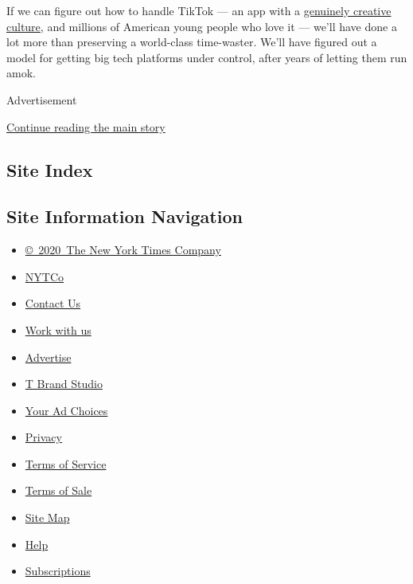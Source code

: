If we can figure out how to handle TikTok --- an app with a
\href{https://www.nytimes3xbfgragh.onion/2020/07/10/style/tiktok-ban-us-users-influencers-taylor-lorenz.html}{genuinely
creative culture}, and millions of American young people who love it ---
we'll have done a lot more than preserving a world-class time-waster.
We'll have figured out a model for getting big tech platforms under
control, after years of letting them run amok.

Advertisement

\protect\hyperlink{after-bottom}{Continue reading the main story}

\hypertarget{site-index}{%
\subsection{Site Index}\label{site-index}}

\hypertarget{site-information-navigation}{%
\subsection{Site Information
Navigation}\label{site-information-navigation}}

\begin{itemize}
\tightlist
\item
  \href{https://help.nytimes3xbfgragh.onion/hc/en-us/articles/115014792127-Copyright-notice}{©~2020~The
  New York Times Company}
\end{itemize}

\begin{itemize}
\tightlist
\item
  \href{https://www.nytco.com/}{NYTCo}
\item
  \href{https://help.nytimes3xbfgragh.onion/hc/en-us/articles/115015385887-Contact-Us}{Contact
  Us}
\item
  \href{https://www.nytco.com/careers/}{Work with us}
\item
  \href{https://nytmediakit.com/}{Advertise}
\item
  \href{http://www.tbrandstudio.com/}{T Brand Studio}
\item
  \href{https://www.nytimes3xbfgragh.onion/privacy/cookie-policy\#how-do-i-manage-trackers}{Your
  Ad Choices}
\item
  \href{https://www.nytimes3xbfgragh.onion/privacy}{Privacy}
\item
  \href{https://help.nytimes3xbfgragh.onion/hc/en-us/articles/115014893428-Terms-of-service}{Terms
  of Service}
\item
  \href{https://help.nytimes3xbfgragh.onion/hc/en-us/articles/115014893968-Terms-of-sale}{Terms
  of Sale}
\item
  \href{https://spiderbites.nytimes3xbfgragh.onion}{Site Map}
\item
  \href{https://help.nytimes3xbfgragh.onion/hc/en-us}{Help}
\item
  \href{https://www.nytimes3xbfgragh.onion/subscription?campaignId=37WXW}{Subscriptions}
\end{itemize}
